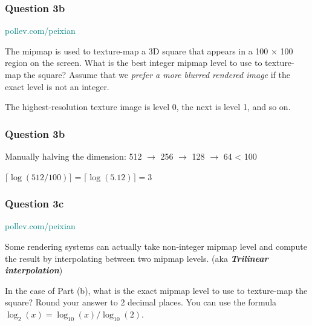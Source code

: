\documentclass{beamer}
\begin{document}
\begin{frame}
    \frametitle{Question 3b}

    \begin{tcolorbox}[colback=teal!5!white]
        \textcolor{teal}{pollev.com/peixian}
    \end{tcolorbox}

    The mipmap is used to texture-map a 3D square that appears in a 100 $\times$ 100 region on the screen. 
    What is the best integer mipmap level to use to texture-map the square? 
    Assume that we \textit{prefer a more blurred rendered image} if the exact level is not an integer. 

    \vspace{1em}
    
    The highest-resolution texture image is level 0, the next is level 1, and so on.

\end{frame}

\begin{frame}
    \frametitle{Question 3b}

    Manually halving the dimension: 
    512 $\rightarrow$ 256 $\rightarrow$ 128 $\rightarrow$ 64 < 100

    \begin{tcolorbox}
        \centering
        $\lceil \log(512/100) \rceil = \lceil \log(5.12) \rceil = 3$
    \end{tcolorbox}


\end{frame}

\begin{frame}
    \frametitle{Question 3c}

    \begin{tcolorbox}[colback=teal!5!white]
        \textcolor{teal}{pollev.com/peixian}
    \end{tcolorbox}

    Some rendering systems can actually take non-integer mipmap level and compute the result by interpolating between 
    two mipmap levels. (aka \textbf{\textit{Trilinear interpolation}})

    \vspace{1em}
    
    In the case of Part (b), what is the exact mipmap level to use to texture-map the square? Round your answer to 2 decimal places. 
    You can use the formula $\log_2(x) = \log_{10}(x) / \log_{10}(2)$.

\end{frame}
\end{document}
